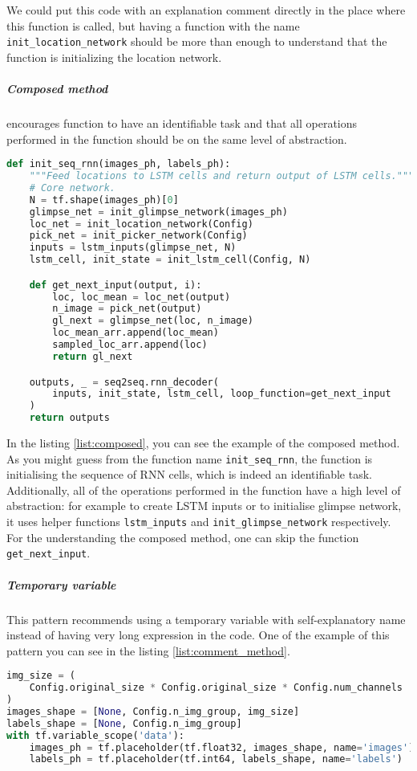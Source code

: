 We could put this code  with an explanation
comment directly in the place where this function is called, but having
a function with the name \lstinline{init_location_network} should be more than enough
to understand that the function is initializing the location network.

\subparagraph{Composed method} encourages function to have an identifiable
task and that all operations performed in the function should be on the same
level of abstraction.

\begin{lstlisting}[language=Python, caption={Method comment example},label={list:composed}]
def init_seq_rnn(images_ph, labels_ph):
    """Feed locations to LSTM cells and return output of LSTM cells."""
    # Core network.
    N = tf.shape(images_ph)[0]
    glimpse_net = init_glimpse_network(images_ph)
    loc_net = init_location_network(Config)
    pick_net = init_picker_network(Config)
    inputs = lstm_inputs(glimpse_net, N)
    lstm_cell, init_state = init_lstm_cell(Config, N)

    def get_next_input(output, i):
        loc, loc_mean = loc_net(output)
        n_image = pick_net(output)
        gl_next = glimpse_net(loc, n_image)
        loc_mean_arr.append(loc_mean)
        sampled_loc_arr.append(loc)
        return gl_next

    outputs, _ = seq2seq.rnn_decoder(
        inputs, init_state, lstm_cell, loop_function=get_next_input
    )
    return outputs
\end{lstlisting}

In the listing \ref{list:composed}, you can see the example of the composed method.
As you might guess from the function name \lstinline{init_seq_rnn}, the
function
is initialising the sequence of RNN cells, which is indeed an identifiable task.
Additionally, all of the operations performed in the function
have a high level of abstraction: for example to
create LSTM inputs or to initialise glimpse network, it uses helper functions
\lstinline{lstm_inputs} and \lstinline{init_glimpse_network} respectively.
For the understanding the composed method, one can skip the function \lstinline{get_next_input}.

\subparagraph{Temporary variable} This pattern recommends using a temporary
variable with self-explanatory name instead of having very long expression
in the code. One of the example of this pattern you can see
in the listing \ref{list:comment_method}.

\begin{lstlisting}[language=Python, caption={Method comment example},label={list:comment_method}]
img_size = (
	Config.original_size * Config.original_size * Config.num_channels
)
images_shape = [None, Config.n_img_group, img_size]
labels_shape = [None, Config.n_img_group]
with tf.variable_scope('data'):
	images_ph = tf.placeholder(tf.float32, images_shape, name='images')
	labels_ph = tf.placeholder(tf.int64, labels_shape, name='labels')
\end{lstlisting}

